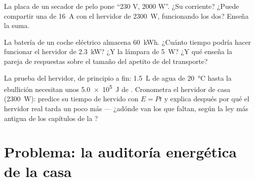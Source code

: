 \begin{exercise}[$\star\star$]\label{exo:g9:electric-power-energy:10}
La placa de un secador de pelo pone ``230 V, 2000 W''. ¿Su corriente?
¿Puede compartir una  de \qty{16}{A} con el hervidor de
\qty{2300}{W}, funcionando los dos? Enseña la suma.
\end{exercise}

\begin{exercise}[$\star\star$]\label{exo:g9:electric-power-energy:11}
La batería de un coche eléctrico almacena \qty{60}{kWh}.
¿Cuánto tiempo podría hacer funcionar el hervidor de \qty{2.3}{kW}? ¿Y
la lámpara de \qty{5}{W}? ¿Y qué enseña la pareja de respuestas sobre
el tamaño del apetito de  del transporte?
\end{exercise}

\begin{exercise}[$\star\star\star$]\label{exo:g9:electric-power-energy:12}
La prueba del hervidor, de principio a fin: \qty{1.5}{L} de agua de
\qty{20}{\celsius} hasta la ebullición necesitan unos \qty{5.0e5}{J} de
. Cronometra el hervidor de casa (\qty{2300}{W}): predice su
tiempo de hervido con $E = P t$ y explica después por qué el hervidor
real tarda un poco más --- ¿adónde van los  que faltan,
según la ley más antigua de los capítulos de la ?
\end{exercise}

\section{Problema: la auditoría energética de la casa}

